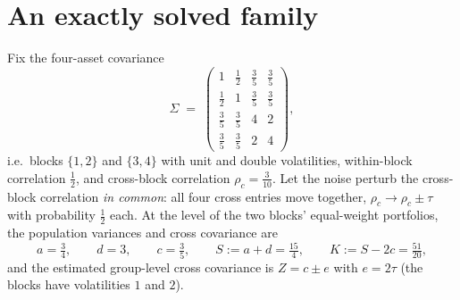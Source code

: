 \documentclass[11pt]{article}
\theoremstyle{remark}
\begin{document}
\section{An exactly solved family}
\label{sec:family}

Fix the four-asset covariance
\begin{equation}
  \Sigma \;=\;
  \begin{pmatrix}
    1 & \tfrac12 & \tfrac35 & \tfrac35 \\
    \tfrac12 & 1 & \tfrac35 & \tfrac35 \\
    \tfrac35 & \tfrac35 & 4 & 2 \\
    \tfrac35 & \tfrac35 & 2 & 4
  \end{pmatrix},
  \label{eq:familycov}
\end{equation}
i.e.\ blocks $\{1,2\}$ and $\{3,4\}$ with unit and double volatilities,
within-block correlation $\tfrac12$, and cross-block correlation
$\rho_c = \tfrac{3}{10}$. Let the noise perturb the cross-block correlation
\emph{in common}: all four cross entries move together,
$\rho_c \to \rho_c \pm \tau$ with probability $\tfrac12$ each. At the level
of the two blocks' equal-weight portfolios, the population variances and
cross covariance are
\[
  a = \tfrac34, \qquad d = 3, \qquad c = \tfrac35,
  \qquad S := a + d = \tfrac{15}{4}, \qquad K := S - 2c = \tfrac{51}{20},
\]
and the estimated group-level cross covariance is $Z = c \pm e$ with
$e = 2\tau$ (the blocks have volatilities $1$ and $2$).
\end{document}
